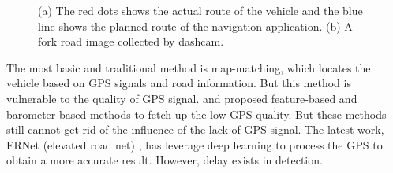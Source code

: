\documentclass[journal]{IEEEtran}
\begin{document}
\begin{figure}[tp]\centering
    \caption{(a) The red dots shows the actual route of the vehicle and the blue line shows the planned route of the navigation application. (b) A fork road image collected by dashcam.}
    \label{fig:intro}
\end{figure}

The most basic and traditional method is map-matching, which locates the vehicle based on GPS signals and road information. But this method is vulnerable to the quality of GPS signal. \cite{gong2015deel} and \cite{won2017hybridbaro} proposed feature-based and barometer-based methods to fetch up the low GPS quality. But these methods still cannot get rid of the influence of the lack of GPS signal.  The latest work, ERNet (elevated road net) \cite{zhang2020elevated}, has leverage deep learning to process the GPS to obtain a more accurate result. However, delay exists in detection. 
\end{document}
